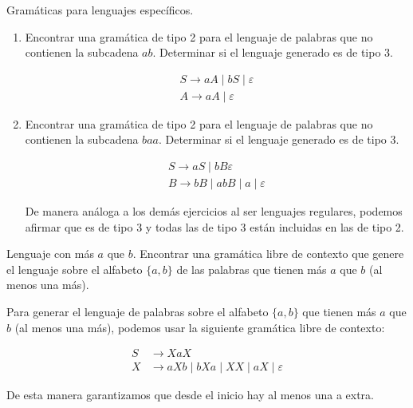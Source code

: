 \documentclass[12pt]{book} %
\begin{document}
\begin{ejercicio}
Gramáticas para lenguajes específicos.

\begin{enumerate}[label=\alph*)]
    \item Encontrar una gramática de tipo 2 para el lenguaje de palabras que no contienen la subcadena $ab$.  
    Determinar si el lenguaje generado es de tipo 3.

    \begin{solucion}[a]

    \begin{align*}
    S \rightarrow aA \mid bS \mid \varepsilon \\
    A \rightarrow aA \mid \varepsilon
    \end{align*}

    \end{solucion}

    \item Encontrar una gramática de tipo 2 para el lenguaje de palabras que no contienen la subcadena $baa$.  
    Determinar si el lenguaje generado es de tipo 3.

    \begin{solucion}[b]
    \begin{align*}
    S \rightarrow aS \mid bB \varepsilon \\
    B \rightarrow bB \mid abB \mid a \mid \varepsilon
    \end{align*}

    De manera análoga a los demás ejercicios al ser lenguajes regulares, podemos afirmar que es de tipo 3 y todas las de tipo 3 están incluidas en las de tipo 2.

    \end{solucion}

\end{enumerate}

\end{ejercicio}

\begin{ejercicio}
Lenguaje con más $a$ que $b$. Encontrar una gramática libre de contexto que genere el lenguaje sobre el alfabeto $\{a, b\}$ de las palabras que tienen más $a$ que $b$ (al menos una más).
\end{ejercicio}

\begin{solucion}

Para generar el lenguaje de palabras sobre el alfabeto $\{a, b\}$ que tienen más $a$ que $b$ (al menos una más), podemos usar la siguiente gramática libre de contexto:

\begin{align*}
S &\to XaX \\
X &\to aXb \mid bXa \mid XX \mid aX \mid \varepsilon
\end{align*}

De esta manera garantizamos que desde el inicio hay al menos una a extra.


\end{solucion}
\end{document}
